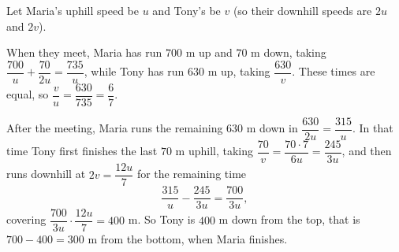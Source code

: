 Let Maria's uphill speed be $u$ and Tony's be $v$ (so their downhill speeds are $2u$ and $2v$).

When they meet, Maria has run $700$ m up and $70$ m down, taking $\dfrac{700}{u}+\dfrac{70}{2u}=\dfrac{735}{u}$, while Tony has run $630$ m up, taking $\dfrac{630}{v}$. These times are equal, so $\dfrac {v}{u}=\dfrac{630}{735}=\dfrac{6}{7}$.

After the meeting, Maria runs the remaining $630$ m down in $\dfrac{630}{2u}=\dfrac{315}{u}$. In that time Tony first finishes the last $70$ m uphill, taking $\dfrac{70}{v}=\dfrac{70\cdot7}{6u}=\dfrac{245}{3u}$, and then runs downhill at $2v=\dfrac{12u}{7}$ for the remaining time
\[
\dfrac{315}{u}-\dfrac{245}{3u}=\dfrac{700}{3u},
\]
covering $\dfrac{700}{3u}\cdot\dfrac{12u}{7}=400$ m. So Tony is $400$ m down from the top, that is $700-400=\boxed{300\text{ m}}$ from the bottom, when Maria finishes.

